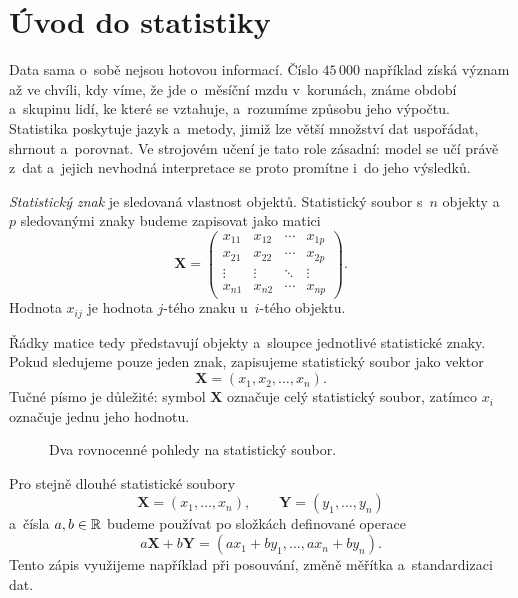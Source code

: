 \section{Úvod do statistiky}\label{sec:ai-uvod-statistika}

Data sama o~sobě nejsou hotovou informací. Číslo \(45\,000\) například získá význam až ve chvíli, kdy víme, že jde o~měsíční mzdu v~korunách, známe období a~skupinu lidí, ke které se vztahuje, a~rozumíme způsobu jeho výpočtu. Statistika poskytuje jazyk a~metody, jimiž lze větší množství dat uspořádat, shrnout a~porovnat. Ve strojovém učení je tato role zásadní: model se učí právě z~dat a~jejich nevhodná interpretace se proto promítne i~do jeho výsledků.

\begin{definition}\label{def:ai-statisticky-soubor}
    \emph{Statistický znak} je sledovaná vlastnost objektů. Statistický soubor s~\(n\) objekty a~\(p\) sledovanými znaky budeme zapisovat jako matici
    \[
        \mathbf{X}
        =
        \begin{pmatrix}
            x_{11} & x_{12} & \cdots & x_{1p}\\
            x_{21} & x_{22} & \cdots & x_{2p}\\
            \vdots & \vdots & \ddots & \vdots\\
            x_{n1} & x_{n2} & \cdots & x_{np}
        \end{pmatrix}.
    \]
    Hodnota \(x_{ij}\) je hodnota \(j\)-tého znaku u~\(i\)-tého objektu.
\end{definition}

Řádky matice tedy představují objekty a~sloupce jednotlivé statistické znaky. Pokud sledujeme pouze jeden znak, zapisujeme statistický soubor jako vektor
\[
    \mathbf{X}=(x_1,x_2,\ldots,x_n).
\]
Tučné písmo je důležité: symbol \(\mathbf{X}\) označuje celý statistický soubor, zatímco \(x_i\) označuje jednu jeho hodnotu.

\begin{figure}[ht]
    \centering
    
    \caption{Dva rovnocenné pohledy na statistický soubor.}
    \label{fig:ai-statisticky-soubor}
\end{figure}

Pro stejně dlouhé statistické soubory
\[
    \mathbf{X}=(x_1,\ldots,x_n),
    \qquad
    \mathbf{Y}=(y_1,\ldots,y_n)
\]
a~čísla \(a,b\in\mathbb{R}\) budeme používat po složkách definované operace
\[
    a\mathbf{X}+b\mathbf{Y}
    =
    (ax_1+by_1,\ldots,ax_n+by_n).
\]
Tento zápis využijeme například při posouvání, změně měřítka a~standardizaci dat.

